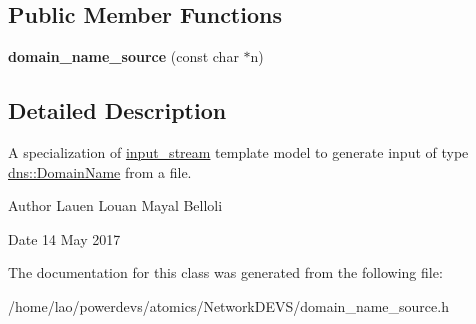 \subsection*{Public Member Functions}
\begin{DoxyCompactItemize}
\item 
{\bfseries domain\+\_\+name\+\_\+source} (const char $\ast$n)\hypertarget{classdomain__name__source_a76cb055b27491617cad5842617bfe299}{}\label{classdomain__name__source_a76cb055b27491617cad5842617bfe299}

\end{DoxyCompactItemize}


\subsection{Detailed Description}
A specialization of \hyperlink{classinput__stream}{input\+\_\+stream} template model to generate input of type \hyperlink{structdns_1_1DomainName}{dns\+::\+Domain\+Name} from a file. 

\begin{DoxyAuthor}{Author}
Lauen Louan Mayal Belloli 
\end{DoxyAuthor}
\begin{DoxyDate}{Date}
14 May 2017 
\end{DoxyDate}


The documentation for this class was generated from the following file\+:\begin{DoxyCompactItemize}
\item 
/home/lao/powerdevs/atomics/\+Network\+D\+E\+V\+S/domain\+\_\+name\+\_\+source.\+h\end{DoxyCompactItemize}
